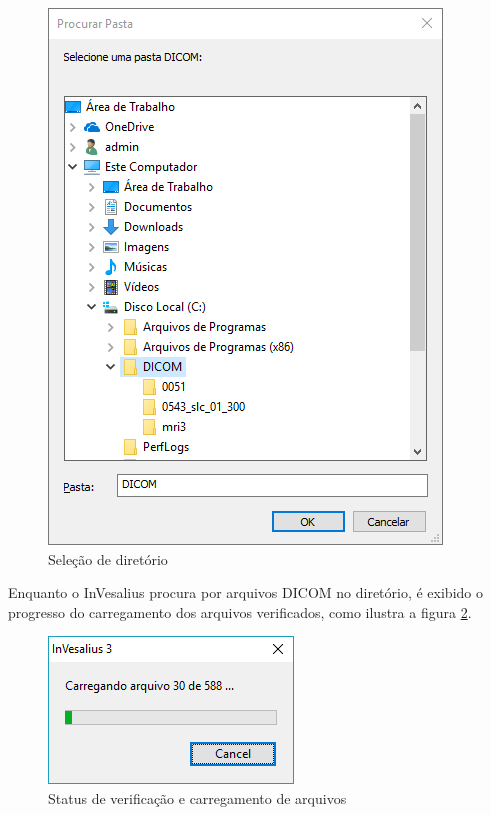 \begin{figure}[!htb]
\centering
\includegraphics[scale=0.5]{../user_guide_figures/invesalius_screen/import_select_folder_pt.png}
\caption{Seleção de diretório}
\label{fig:win_folder}
\end{figure}

\hspace{.2cm}

Enquanto o InVesalius procura por arquivos DICOM no diretório, é exibido o progresso
do carregamento dos arquivos verificados, como ilustra a figura \ref{fig:ver_file}.

\begin{figure}[!htb]
\centering
\includegraphics[scale=0.6]{../user_guide_figures/invesalius_screen/import_load_files_pt.png}
\caption{Status de verificação e carregamento de arquivos}
\label{fig:ver_file}
\end{figure}

